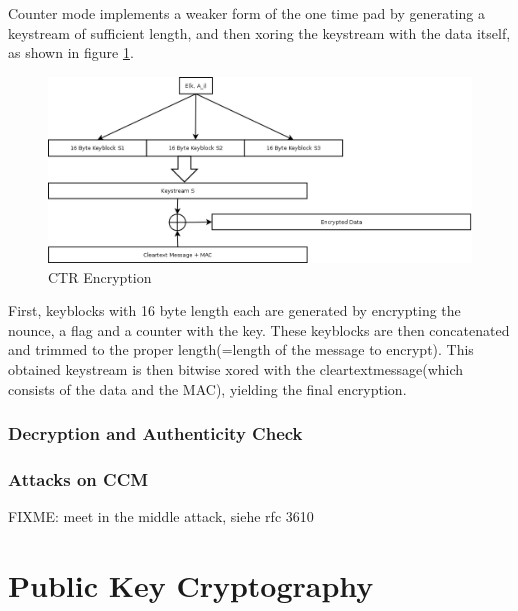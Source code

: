 Counter mode implements a weaker form of the one time pad by generating a keystream of sufficient
length, and then xoring the keystream with the data itself, as shown in figure \ref{fig:ctr}.

\begin{figure}
    \centering
    \includegraphics[width=1\textwidth]{figures/CTR.png}
    \caption{CTR Encryption}
    \label{fig:ctr}
\end{figure}

First, keyblocks with 16 byte length each are generated by encrypting the nounce, a flag and a counter with the key. These 
keyblocks are then concatenated and trimmed to the proper length(=length of the message to encrypt). This obtained keystream
is then bitwise xored with the cleartextmessage(which consists of the data and the MAC), yielding the final encryption.


\subsubsection{Decryption and Authenticity Check}

\subsubsection{Attacks on CCM}

FIXME: meet in the middle attack, siehe rfc 3610

\section{Public Key Cryptography}

